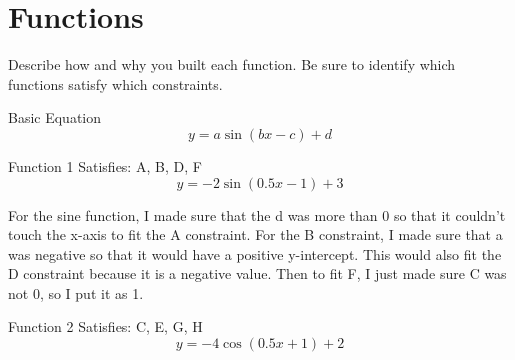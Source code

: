 \documentclass[pstricks,border=11pt]{article}
\begin{document}
\vspace{5mm}
\section{Functions}
Describe how and why you built each function. Be sure to identify which functions satisfy which constraints.

\hfill \break
Basic Equation
\begin{displaymath}
    y=a\sin(bx-c)+d
\end{displaymath}

\vspace{10mm} %
\hfill \break
Function 1
\hfill \break
Satisfies: A, B, D, F
\begin{displaymath}
    y=-2\sin(0.5x-1)+3
\end{displaymath}

\vspace{5mm}
\begin{center}
\end{center}
\vspace{5mm}

For the sine function, I made sure that the d was more than 0 so that it couldn't touch the x-axis to fit the A constraint. For the B constraint, I made sure that a was negative so that it would have a positive y-intercept. This would also fit the D constraint because it is a negative value. Then to fit F, I just made sure C was not 0, so I put it as 1.

\vspace{30mm} %
\hfill \break
Function 2
\hfill \break
Satisfies: C, E, G, H
\begin{displaymath}
    y=-4\cos(0.5x+1)+2
\end{displaymath}
\end{document}
